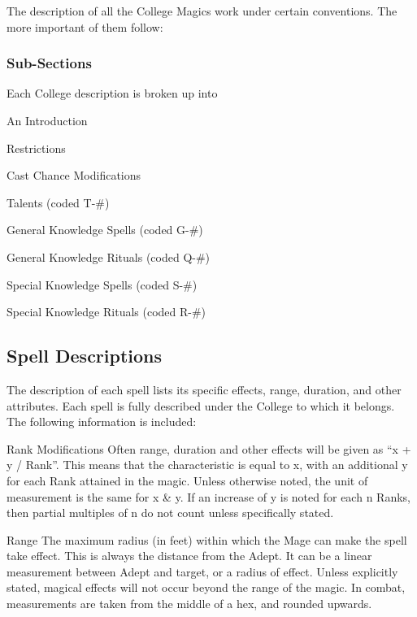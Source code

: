 \begin{multicols*}{3}
The description of all the College Magics work under certain
conventions. The more important of them follow:

\subsubsection{Sub-Sections}

Each College description is broken up into
\begin{Itemize}

\item An Introduction
\item Restrictions
\item Cast Chance Modifications
\item Talents (coded T-\#)
\item General Knowledge Spells (coded G-\#)
\item General Knowledge Rituals (coded Q-\#)
\item Special Knowledge Spells (coded S-\#)
\item Special Knowledge Rituals (coded R-\#)

\end{Itemize}


\subsection{Spell Descriptions}

The description of each spell lists its specific effects, range,
duration, and other attributes. Each spell is fully described under
the College to which it belongs. The following information is
included:

\begin{Description}

\item[Rank Modifications]
Often range, duration and other effects will be given as ``x + y /
Rank''. This means that the characteristic is equal to x, with an
additional y for each Rank attained in the magic. Unless otherwise
noted, the unit of measurement is the same for x \& y. If an increase
of y is noted for each n Ranks, then partial multiples of n do not
count unless specifically stated.

\item[Range]
The maximum radius (in feet) within which the Mage can make the spell
take effect.  This is always the distance from the Adept. It can be a
linear measurement between Adept and target, or a radius of
effect. Unless explicitly stated, magical effects will not occur
beyond the range of the magic. In combat, measurements are taken from
the middle of a hex, and rounded upwards.


\end{Description}
\end{multicols*}
